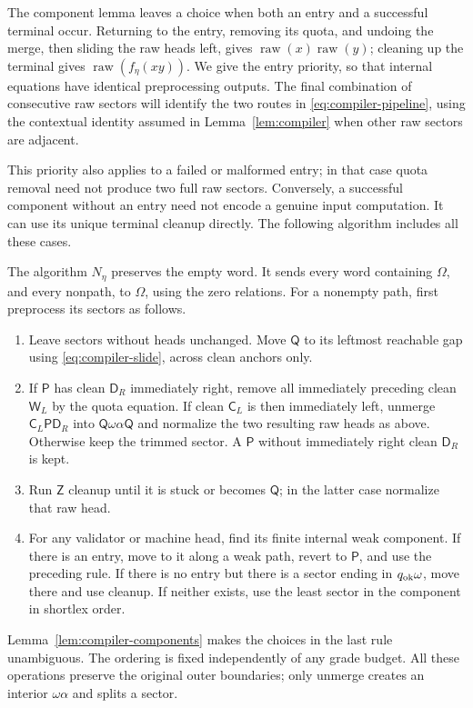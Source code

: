 The component lemma leaves a choice when both an entry and a successful
terminal occur. Returning to the entry, removing its quota, and undoing
the merge, then sliding the raw heads left, gives
$\operatorname{raw}(x)\operatorname{raw}(y)$;
cleaning up the terminal gives
$\operatorname{raw}(f_\eta(xy))$. We give the entry priority, so that
internal equations have identical preprocessing outputs. The final
combination of consecutive raw sectors will identify the two routes
in \eqref{eq:compiler-pipeline}, using the contextual identity assumed
in Lemma~\ref{lem:compiler} when other raw sectors are adjacent.

This priority also applies to a failed or malformed entry; in that case
quota removal need not produce two full raw sectors. Conversely, a
successful component without an entry need not encode a genuine input
computation. It can use its unique terminal cleanup directly. The
following algorithm includes all these cases.

The algorithm $N_\eta$ preserves the empty word. It sends every word
containing $\Omega$, and every nonpath, to $\Omega$, using the zero
relations. For a nonempty path, first preprocess its sectors as follows.
\begin{enumerate}
\item Leave sectors without heads unchanged. Move $\mathsf Q$ to its
  leftmost reachable gap using \eqref{eq:compiler-slide}, across clean
  anchors only.
\item If $\mathsf P$ has clean $\mathsf D_R$ immediately right, remove
  all immediately preceding clean $\mathsf W_L$ by the quota equation.
  If clean $\mathsf C_L$ is then immediately left, unmerge
  $\mathsf C_L\mathsf P\mathsf D_R$ into
  $\mathsf Q\omega\alpha\mathsf Q$ and normalize the two resulting
  raw heads as above. Otherwise keep the trimmed sector. A
  $\mathsf P$ without immediately right clean $\mathsf D_R$ is kept.
\item Run $\mathsf Z$ cleanup until it is stuck or becomes
  $\mathsf Q$; in the latter case normalize that raw head.
\item For any validator or machine head, find its finite internal weak
  component. If there is an entry, move to it along a weak path, revert
  to $\mathsf P$, and use the preceding rule. If there is no entry but
  there is a sector ending in $q_{\rm ok}\omega$, move there and use
  cleanup. If neither
  exists, use the least sector in the component in shortlex order.
\end{enumerate}
Lemma~\ref{lem:compiler-components} makes the choices in the last rule
unambiguous. The ordering is fixed independently of any grade budget.
All these operations preserve the original outer boundaries; only
unmerge creates an interior $\omega\alpha$ and splits a sector.

